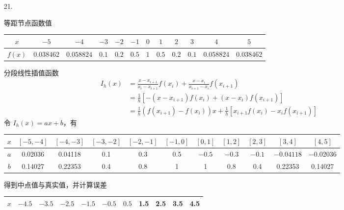 \documentclass{sjtuarticle}
\begin{document}
\begin{itemize}
\begin{solution}
    \end{solution}
    \item[21.] \begin{solution}
        等距节点函数值
        \begin{table}[H]
            \centering
            \begin{tabular}{c*{11}{c}}
                \toprule
                $x$    & $-5$ & $-4$ & $-3$ & $-2$ & $-1$ & $0$ & $1$ & $2$ &$3$ & $4$ & $5$\\
                \midrule
                $f(x)$ & $0.038462$ & $0.058824$ & $0.1$ & $0.2$ & $0.5$ & $1$ & $0.5$ & $0.2$ & $0.1$ & $0.058824$ & $0.038462$ \\
                \bottomrule
            \end{tabular}
        \end{table}
        分段线性插值函数
        \begin{align*}
            I_h(x)&=\frac{x-x_{i+1}}{x_i-x_{i+1}}f(x_i)+\frac{x-x_i}{x_{i+1}-x_i}f(x_{i+1})\\
            &=\frac{1}{h}[-(x-x_{i+1})f(x_i)+(x-x_i)f(x_{i+1})]\\
            &=\frac{1}{h}(f(x_{i+1})-f(x_i))x+\frac{1}{h}[x_{i+1}f(x_i)-x_if(x_{i+1})]
        \end{align*}
        令 $I_h(x)=ax+b$，有
        \begin{table}[H]
            \centering
            \begin{tabular}{c*{10}{c}}
                \toprule
                $x$ & $[-5,-4]$ & $[-4,-3]$ & $[-3,-2]$ & $[-2,-1]$ & $[-1,0]$ & $[0,1]$ & $[1,2]$ & $[2,3]$ & $[3,4]$ & $[4,5]$ \\
                \midrule
                $a$ & 0.02036 & 0.04118 & 0.1 & 0.3 & 0.5 & $-0.5$ & $-0.3$ & $-0.1$ & $-0.04118$ & $-0.02036$ \\
                $b$ & 0.14027 & 0.22353 & 0.4 & 0.8 & 1 & 1 & 0.8 & 0.4 & 0.22353 & 0.14027 \\
                \bottomrule
            \end{tabular}
        \end{table}
        得到中点值与真实值，并计算误差
        \begin{table}[H]
            \centering
            \begin{tabular}{c*{10}{c}}
                \toprule
                $x$          & $-4.5$  & $-3.5$ & $-2.5$ & $-1.5$ & $-0.5$ & $0.5$ & 1.5 & 2.5 & 3.5 & 4.5 \\
                \midrule

\end{tabular}
\end{table}
\end{solution}
\end{itemize}
\end{document}
